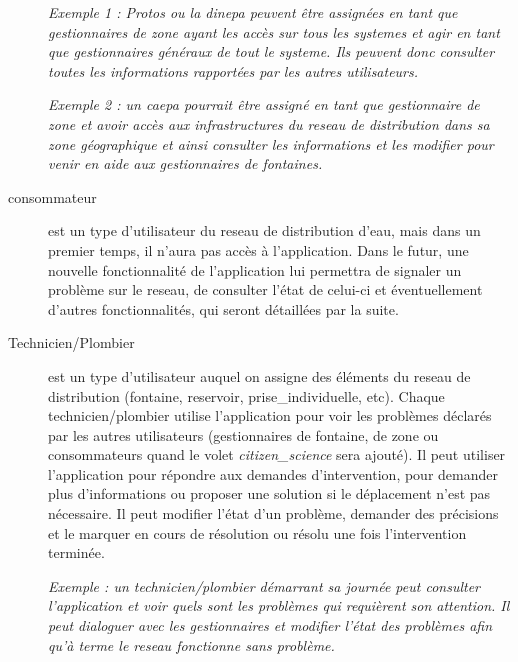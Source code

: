 \documentclass[a4paper, 11pt]{article}
\begin{document}
\begin{description}
    \emph{Exemple 1 : Protos ou la \gls{dinepa} peuvent être assignées en tant que gestionnaires de \gls{zone} ayant les accès sur tous les \gls{systeme}s et agir en tant que gestionnaires généraux de tout le \gls{systeme}. Ils peuvent donc consulter toutes les informations rapportées par les autres \glspl{utilisateur}.}

    \emph{Exemple 2 : un \gls{caepa} pourrait être assigné en tant que gestionnaire de \gls{zone} et avoir accès aux infrastructures du \gls{reseau} de distribution dans sa \gls{zone} géographique et ainsi consulter les informations et les modifier pour venir en aide aux gestionnaires de \glspl{fontaine}.}

    \item[\gls{consommateur}] est un type d'\gls{utilisateur} du \gls{reseau} de distribution d'eau, mais dans un premier temps, il n'aura pas accès à l'\gls{application}. Dans le futur, une nouvelle fonctionnalité de l'\gls{application} lui permettra de signaler un problème sur le \gls{reseau}, de consulter l'état de celui-ci et éventuellement d'autres fonctionnalités, qui seront détaillées par la suite.

    \item[Technicien/Plombier] est un type d'\gls{utilisateur} auquel on assigne des éléments du \gls{reseau} de distribution (\gls{fontaine}, \gls{reservoir}, \gls{prise_individuelle}, etc). Chaque technicien/plombier utilise l'\gls{application} pour voir les problèmes déclarés par les autres \glspl{utilisateur} (gestionnaires de \gls{fontaine}, de \gls{zone} ou \glspl{consommateur} quand le volet \emph{\gls{citizen_science}} sera ajouté). Il peut utiliser l'\gls{application} pour répondre aux demandes d'intervention, pour demander plus d'informations ou proposer une solution si le déplacement n'est pas nécessaire. Il peut modifier l'état d'un problème, demander des précisions et le marquer en cours de résolution ou résolu une fois l'intervention terminée.

    \emph{Exemple : un technicien/plombier démarrant sa journée peut consulter l'\gls{application} et voir quels sont les problèmes qui requièrent son attention. Il peut dialoguer avec les gestionnaires et modifier l'état des problèmes afin qu'à terme le \gls{reseau} fonctionne sans problème.}

  \end{description}
\end{document}
